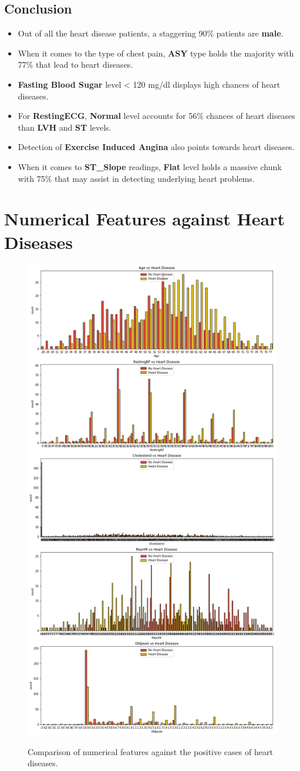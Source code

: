 \subsection*{Conclusion}
\begin{itemize}
    \item Out of all the heart disease patients, a staggering 90\% patients are \textbf{male}.
    \item When it comes to the type of chest pain, \textbf{ASY} type holds the majority with 77\% that lead to heart diseases.
    \item \textbf{Fasting Blood Sugar} level < 120 mg/dl displays high chances of heart diseases.
    \item For \textbf{RestingECG}, \textbf{Normal} level accounts for 56\% chances of heart diseases than \textbf{LVH} and \textbf{ST} levels.
    \item Detection of \textbf{Exercise Induced Angina} also points towards heart diseases.
    \item  When it comes to \textbf{ST\_Slope} readings, \textbf{Flat} level holds a massive chunk with 75\% that may assist in detecting underlying heart problems. 
\end{itemize}

\section{Numerical Features against Heart Diseases}
\begin{figure}[!htpb]
    \centering
    \includegraphics[width=0.4\linewidth]{Figures/Outputs/num-tar-var.png}
    \label{Comparison between numerical features and Heart Diseases}
    \caption{Comparison of numerical features against the positive cases of heart diseases.}
\end{figure}

